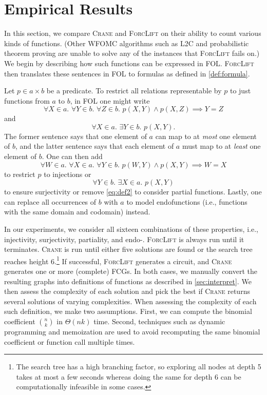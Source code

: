 \section{Empirical Results}\label{sec:results} %

In this section, we compare \textsc{Crane} and \textsc{ForcLift}
\citep{DBLP:conf/ijcai/BroeckTMDR11} on their ability to count various kinds of
functions. (Other WFOMC algorithms such as \textsc{L2C}
\citep{DBLP:conf/kr/KazemiP16} and probabilistic theorem proving
\citep{DBLP:journals/cacm/GogateD16} are unable to solve any of the instances
that \textsc{ForcLift} fails on.) We begin by describing how such functions can
be expressed in FOL\@. \textsc{ForcLift} then translates these sentences in FOL
to formulas as defined in \cref{def:formula}.

Let $p \in a \times b$ be a predicate. To restrict all relations representable
by $p$ to just functions from $a$ to $b$, in FOL one might write
\[
  \forall X \in a\text{. }\forall Y \in b\text{. }\forall Z \in b\text{. }p(X, Y) \land p(X, Z) \implies Y = Z
\]
and
\begin{equation}\label{eq:def2}
  \forall X \in a\text{. }\exists Y \in b\text{. }p(X, Y).
\end{equation}
The former sentence says that one element of $a$ can map to at \emph{most} one
element of $b$, and the latter sentence says that each element of $a$ must map
to at \emph{least} one element of $b$. One can then add
\[
  \forall W \in a\text{. }\forall X \in a\text{. }\forall Y \in b\text{. }p(W, Y) \land p(X, Y) \implies W = X
\]
to restrict $p$ to injections or
\[
  \forall Y \in b\text{. }\exists X \in a\text{. }p(X, Y)
\]
to ensure surjectivity or remove \cref{eq:def2} to consider partial functions.
Lastly, one can replace all occurrences of $b$ with $a$ to model endofunctions
(i.e., functions with the same domain and codomain) instead.

In our experiments, we consider all sixteen combinations of these properties,
i.e., injectivity, surjectivity, partiality, and endo-. \textsc{ForcLift} is
always run until it terminates. \textsc{Crane} is run until either five
solutions are found or the search tree reaches height 6.\footnote{The search
  tree has a high branching factor, so exploring all nodes at depth 5 takes at
  most a few seconds whereas doing the same for depth 6 can be computationally
  infeasible in some cases.} If successful, \textsc{ForcLift} generates a
circuit, and \textsc{Crane} generates one or more (complete) FCGs. In both
cases, we manually convert the resulting graphs into definitions of functions as
described in \cref{sec:interpret}. We then assess the complexity of each
solution and pick the best if \textsc{Crane} returns several solutions of
varying complexities. When assessing the complexity of each such definition, we
make two assumptions. First, we can compute the binomial coefficient
$\binom{n}{k}$ in $\Theta(nk)$ time. Second, techniques such as dynamic
programming and memoization are used to avoid recomputing the same binomial
coefficient or function call multiple times.


